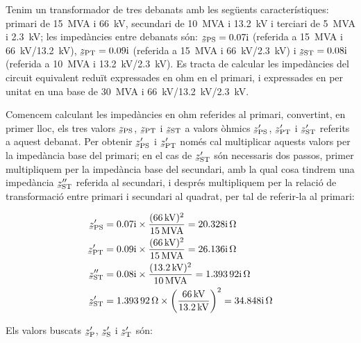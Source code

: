 	
\begin{exemple}[\ImpCircEqTrafoTresDeb{}]
	\addcontentsxms{\ImpCircEqTrafoTresDeb}
    Tenim un transformador de tres debanats amb les següents característiques: primari de \qty{15}{MVA} i \qty{66}{kV}, secundari de \qty{10}{MVA} i \qty{13,2}{kV} i terciari de \qty{5}{MVA} i \qty{2,3}{kV}; les impedàncies entre debanats són: $\cmplx{z}\ped{PS} = \complexnum{j 0,07}$ (referida a \qty{15}{MVA} i \qty{66}{kV}/\qty{13,2}{kV}), $\cmplx{z}\ped{PT} = \complexnum{j 0,09}$ (referida a \qty{15}{MVA} i \qty{66}{kV}/\qty{2,3}{kV}) i $\cmplx{z}\ped{ST} = \complexnum{j 0,08}$ (referida a \qty{10}{MVA} i \qty{13,2}{kV}/\qty{2,3}{kV}).  Es tracta de calcular les impedàncies del circuit equivalent reduït expressades en ohm en el primari, i expressades en per unitat en una base de \qty{30}{MVA} i \qty{66}{kV}/\qty{13,2}{kV}/\qty{2,3}{kV}.

    Comencem calculant les impedàncies en ohm referides al primari, convertint, en primer lloc, els tres valors $\cmplx{z}\ped{PS}$, $\cmplx{z}\ped{PT}$ i $\cmplx{z}\ped{ST}$ a valors òhmics $\cmplx{z}\ped{PS}'$, $\cmplx{z}\ped{PT}'$ i $\cmplx{z}\ped{ST}'$ referits a aquest debanat. Per obtenir $\cmplx{z}\ped{PS}'$ i $\cmplx{z}\ped{PT}'$ només cal multiplicar aquests valors per la impedància base del primari; en el cas de $\cmplx{z}\ped{ST}'$ són necessaris dos passos, primer multipliquem per la impedància base del secundari, amb la qual cosa tindrem una impedància $\cmplx{z}\ped{ST}''$ referida al secundari,  i després multipliquem per la relació de transformació entre primari i secundari al quadrat, per tal de referir-la al primari:

    \begin{align*}
        \cmplx{z}\ped{PS}' &=  \complexnum{j 0,07} \times \frac{(\qty{66}{kV})^2}{\qty{15}{MVA}} = \complexqty{j 20,328}{\ohm}\\
        \cmplx{z}\ped{PT}' &=  \complexnum{j 0,09} \times \frac{(\qty{66}{kV})^2}{\qty{15}{MVA}} = \complexqty{j 26,136}{\ohm}\\
        \cmplx{z}\ped{ST}'' &= \complexnum{j 0,08} \times \frac{(\qty{13,2}{kV})^2}{\qty{10}{MVA}} = \complexqty{j 1,39392}{\ohm}\\
        \cmplx{z}\ped{ST}' &=  \qty{1,39392}{\ohm} \times {\left(\frac{\qty{66}{kV}}{\qty{13,2}{kV}}\right)}^2 = \complexqty{j 34,848}{\ohm}
    \end{align*}

    Els valors buscats $\cmplx{z}\ped{P}'$, $\cmplx{z}\ped{S}'$ i $\cmplx{z}\ped{T}'$ són:


\end{exemple}
